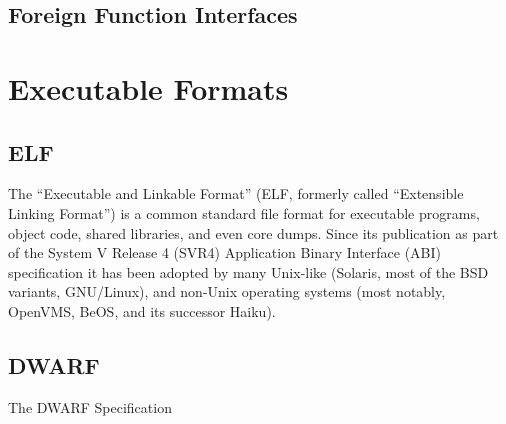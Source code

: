 \subsection{Foreign Function Interfaces}



%

\section{Executable Formats}

\subsection{ELF}

The “Executable and Linkable Format” (ELF, formerly called “Extensible Linking
Format”) is a common standard file format for executable programs, object
code, shared libraries, and even core dumps. Since its publication as part of
the System V Release 4 (SVR4) Application Binary Interface (ABI) specification
\cite[c.~4]{elfspec-sysv}
it has been adopted by many Unix-like (Solaris, most of the BSD variants,
GNU/Linux), and non-Unix operating systems (most notably, OpenVMS, BeOS, and
its successor Haiku).

\subsection{DWARF}

The DWARF Specification \cite{dwarfspecv4}


